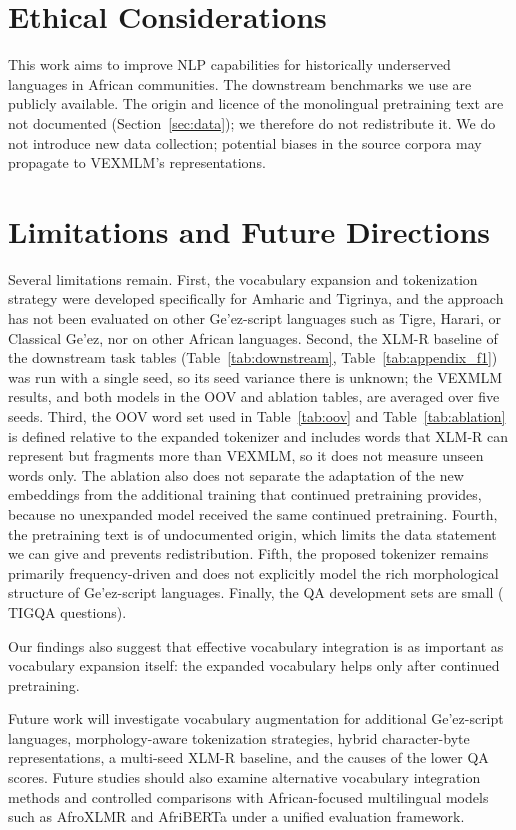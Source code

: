 \section*{Ethical Considerations}
This work aims to improve NLP capabilities for historically underserved languages in African communities. The downstream benchmarks we use are publicly available. The origin and licence of the monolingual pretraining text are not documented (Section~\ref{sec:data}); we therefore do not redistribute it. We do not introduce new data collection; potential biases in the source corpora may propagate to VEXMLM's representations.

\section{Limitations and Future Directions}
\label{sec:limitations}
Several limitations remain. First, the vocabulary expansion and tokenization strategy were developed specifically for Amharic and Tigrinya, and the approach has not been evaluated on other Ge'ez-script languages such as Tigre, Harari, or Classical Ge'ez, nor on other African languages. Second, the XLM-R baseline of the downstream task tables (Table~\ref{tab:downstream}, Table~\ref{tab:appendix_f1}) was run with a single seed, so its seed variance there is unknown; the VEXMLM results, and both models in the OOV and ablation tables, are averaged over five seeds. Third, the OOV word set used in Table~\ref{tab:oov} and Table~\ref{tab:ablation} is defined relative to the expanded tokenizer and includes words that XLM-R can represent but fragments more than VEXMLM, so it does not measure unseen words only. The ablation also does not separate the adaptation of the new embeddings from the additional training that continued pretraining provides, because no unexpanded model received the same continued pretraining. Fourth, the pretraining text is of undocumented origin, which limits the data statement we can give and prevents redistribution. Fifth, the proposed tokenizer remains primarily frequency-driven and does not explicitly model the rich morphological structure of Ge'ez-script languages. Finally, the QA development sets are small (\splitTigQAValidation{} TIGQA questions).

Our findings also suggest that effective vocabulary integration is as important as vocabulary expansion itself: the expanded vocabulary helps only after continued pretraining.

Future work will investigate vocabulary augmentation for additional Ge'ez-script languages, morphology-aware tokenization strategies, hybrid character-byte representations, a multi-seed XLM-R baseline, and the causes of the lower QA scores. Future studies should also examine alternative vocabulary integration methods and controlled comparisons with African-focused multilingual models such as AfroXLMR and AfriBERTa under a unified evaluation framework.
